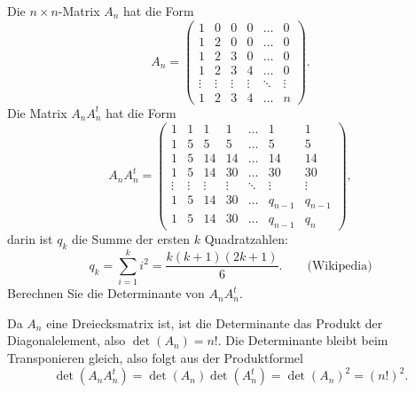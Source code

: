 Die $n\times n$-Matrix $A_n$ hat die Form
\[
A_n=\begin{pmatrix}
     1&     0&     0&     0&\dots &     0\\
     1&     2&     0&     0&\dots &     0\\
     1&     2&     3&     0&\dots &     0\\
     1&     2&     3&     4&\dots &     0\\
\vdots&\vdots&\vdots&\vdots&\ddots&\vdots\\
     1&     2&     3&     4&\dots &     n
\end{pmatrix}.
\]
Die Matrix $A_nA_n^t$ hat die Form
\[
A_nA_n^t
=
\begin{pmatrix}
     1&     1&     1&     1& \dots&      1&      1\\
     1&     5&     5&     5& \dots&      5&      5\\
     1&     5&    14&    14& \dots&     14&     14\\
     1&     5&    14&    30& \dots&     30&     30\\
\vdots&\vdots&\vdots&\vdots&\ddots& \vdots& \vdots\\
     1&     5&    14&    30& \dots&q_{n-1}&q_{n-1}\\
     1&     5&    14&    30& \dots&q_{n-1}&    q_n
\end{pmatrix},
\]
darin ist $q_k$ die Summe der ersten $k$ Quadratzahlen:
\[
q_k=\sum_{i=1}^ki^2=\frac{k(k+1)(2k+1)}6.
\qquad
\text{(Wikipedia)}
\]
Berechnen Sie die Determinante von $A_nA^t_n$.

\begin{loesung}
Da $A_n$ eine Dreiecksmatrix ist, ist die Determinante das Produkt der
Diagonalelement, also $\det(A_n)=n!$. 
Die Determinante bleibt beim Transponieren gleich, also folgt aus der
Produktformel
\[
\det(A_nA_n^t)=\det(A_n)\det(A_n^t)=\det(A_n)^2=(n!)^2.
\]
\end{loesung}


